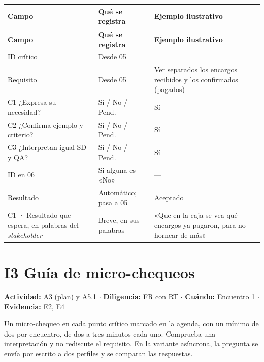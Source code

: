 \documentclass[12pt,letterpaper,oneside]{report}
\begin{document}
{\scriptsize\renewcommand{\arraystretch}{1.25}\setlength{\tabcolsep}{3pt}
\begin{xltabular}{\textwidth}{@{}>{\raggedright\arraybackslash}p{0.25\textwidth}>{\raggedright\arraybackslash}X>{\raggedright\arraybackslash}p{0.30\textwidth}@{}}
\toprule
\textbf{Campo} & \textbf{Qué se registra} & \textbf{Ejemplo ilustrativo} \\
\midrule
\endfirsthead
\toprule
\textbf{Campo} & \textbf{Qué se registra} & \textbf{Ejemplo ilustrativo} \\
\midrule
\endhead
\bottomrule
\endlastfoot
{}ID crítico & Desde 05 &  \\
Requisito & Desde 05 & Ver separados los encargos recibidos y los confirmados (pagados) \\
C1 ¿Expresa su necesidad? & Sí / No / Pend. & Sí \\
C2 ¿Confirma ejemplo y criterio? & Sí / No / Pend. & Sí \\
C3 ¿Interpretan igual SD y QA? & Sí / No / Pend. & Sí \\
ID en 06 & Si alguna es «No» & — \\
Resultado & Automático; pasa a 05 & Aceptado \\
C1 · Resultado que espera, en palabras del \textit{stakeholder} & Breve, en sus palabras & «Que en la caja se vea qué encargos ya pagaron, para no hornear de más» \\
\end{xltabular}}

\section{I3 Guía de micro-chequeos}
\noindent\textbf{Actividad:} A3 (plan) y A5.1 $\cdot$ \textbf{Diligencia:} FR con RT $\cdot$ \textbf{Cuándo:} Encuentro 1 $\cdot$ \textbf{Evidencia:} E2, E4


Un micro-chequeo en cada punto crítico marcado en la agenda, con un mínimo de dos por encuentro, de dos a tres minutos cada uno. Comprueba una interpretación y no rediscute el requisito. En la variante asíncrona, la pregunta se envía por escrito a dos perfiles y se comparan las respuestas.
\end{document}
